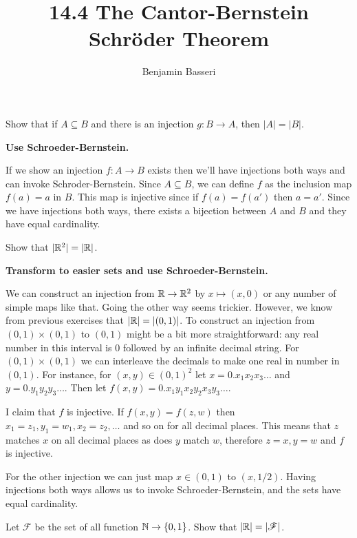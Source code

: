 \documentclass{article}
\title{14.4 The Cantor-Bernstein Schröder Theorem}
\author{Benjamin Basseri}
\begin{document}
\maketitle

\begin{problem}
Show that if $A \subseteq B$ and there is an injection $g: B \to A$, then $|A| = |B|$.
\end{problem}

\textbf{Use Schroeder-Bernstein.}

If we show an injection $f: A \to B$ exists then we'll have injections both ways and can invoke Schroder-Bernstein. Since $A \subseteq B$, we can define $f$ as the inclusion map $f(a) = a$ in $B$. This map is injective since if $f(a) = f(a')$ then $a = a'$. Since we have injections both ways, there exists a bijection between $A$ and $B$ and they have equal cardinality.

\begin{problem}
Show that $|\mathbb{R}^2| = |\mathbb{R}|$.
\end{problem}

\textbf{Transform to easier sets and use Schroeder-Bernstein.}

We can construct an injection from $\mathbb{R} \to \mathbb{R}^2$ by $x \mapsto (x, 0)$ or any number of simple maps like that. Going the other way seems trickier. However, we know from previous exercises that $|\mathbb{R}| = |(0, 1)|$. To construct an injection from $(0, 1) \times (0, 1)$ to $(0, 1)$ might be a bit more straightforward: any real number in this interval is 0 followed by an infinite decimal string. For $(0, 1) \times (0, 1)$ we can interleave the decimals to make one real in number in $(0, 1)$. For instance, for $(x, y) \in (0, 1)^2$ let $x = 0.x_1 x_2 x_3 \ldots$ and $y = 0.y_1 y_2 y_3 \ldots$. Then let $f(x, y) = 0.x_1 y_1 x_2 y_2 x_3 y_3 \ldots$.

I claim that $f$ is injective. If $f(x, y) = f(z, w)$ then $x_1 = z_1, y_1 = w_1, x_2 = z_2, \ldots$ and so on for all decimal places. This means that $z$ matches $x$ on all decimal places as does $y$ match $w$, therefore $z = x, y = w$ and $f$ is injective.

For the other injection we can just map $x \in (0, 1)$ to $(x, 1/2)$. Having injections both ways allows us to invoke Schroeder-Bernstein, and the sets have equal cardinality.

\begin{problem}
Let $\mathscr{F}$ be the set of all function $\mathbb{N} \to \{0, 1\}$. Show that $|\mathbb{R}| = |\mathscr{F}|$.
\end{problem}
\end{document}
